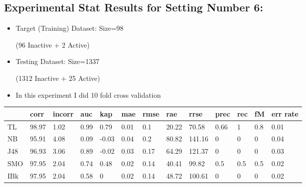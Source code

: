 \documentclass[a4paper,12pt, english]{article}
\begin{document}
\subsection{Experimental Stat Results for Setting Number 6:}
\begin{itemize}
\item Target (Training) Dataset: Size=98 \begin{scriptsize}(96 Inactive + 2 Active)\end{scriptsize} 
\item Testing Dataset: Size=1337 \begin{scriptsize}(1312 Inactive + 25 Active)\end{scriptsize}
\item In this experiment I did 10 fold cross validation
\end{itemize}  
\begin{small}
\begin{center}
    \begin{tabular}{ | l | l | l | l | l | l | l | l | l | l | l | l | l |}
    \hline
      	& corr & incorr  & auc & kap & mae & rmse & rae & rrse & prec & rec & fM & err rate\\ \hline
      	TL & 98.97 & 1.02 & 0.99 & 0.79 & 0.01 & 0.1 & 20.22 & 70.58 & 0.66 & 1 & 0.8 & 0.01\\ \hline
	NB & 95.91 & 4.08 & 0.09 & -0.03 & 0.04 & 0.2 & 80.82 & 141.16 & 0 & 0 & 0 & 0.04\\ \hline
	J48 & 96.93 & 3.06 & 0.89 & -0.02 & 0.03 & 0.17 & 64.29 & 121.37 & 0 & 0 & 0 & 0.03\\ \hline
	SMO & 97.95 & 2.04 & 0.74 & 0.48 & 0.02 & 0.14 & 40.41 & 99.82 & 0.5 & 0.5 & 0.5 & 0.02\\ \hline
	IBk & 97.95 & 2.04 & 0.58 & 0 & 0.02 & 0.14 & 48.72 & 100.61 & 0 & 0 & 0 & 0.02\\ \hline  
    \end{tabular}       
\end{center}
\end{small}
\end{document}
